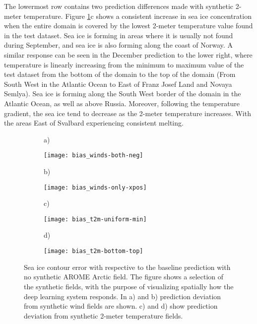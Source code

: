 \documentclass[../main/thesis.tex]{subfiles}
\begin{document}
The lowermost row contains two prediction differences made with synthetic 2-meter temperature. Figure \ref{fig:synthetic_aa_bias}c shows a consistent increase in sea ice concentration when the entire domain is covered by the lowest 2-meter temperature value found in the test dataset. Sea ice is forming in areas where it is usually not found during September, and sea ice is also forming along the coast of Norway. A similar response can be seen in the December prediction to the lower right, where temperature is linearly increasing from the minimum to maximum value of the test dataset from the bottom of the domain to the top of the domain (From South West in the Atlantic Ocean to East of Franz Josef Land and Novaya Semlya). Sea ice is forming along the South West border of the domain in the Atlantic Ocean, as well as above Russia. Moreover, following the temperature gradient, the sea ice tend to decrease as the 2-meter temperature increases. With the areas East of Svalbard experiencing consistent melting.

\begin{figure}
    \centering
    \begin{subfigure}[t]{.03\textwidth}
        a)
    \end{subfigure}
    \begin{subfigure}[t]{.455\textwidth}
        \texttt{[image: bias\_winds-both-neg]}
    \end{subfigure}
    \begin{subfigure}[t]{.03\textwidth}
        b)
    \end{subfigure}
    \begin{subfigure}[t]{.455\textwidth}
        \texttt{[image: bias\_winds-only-xpos]}
    \end{subfigure}
    \begin{subfigure}[t]{.03\textwidth}
        c)
    \end{subfigure}
    \begin{subfigure}[t]{.455\textwidth}
        \texttt{[image: bias\_t2m-uniform-min]}
    \end{subfigure}
    \begin{subfigure}[t]{.03\textwidth}
        d)
    \end{subfigure}
    \begin{subfigure}[t]{.455\textwidth}
        \texttt{[image: bias\_t2m-bottom-top]}
    \end{subfigure}
    \caption{\label{fig:synthetic_aa_bias}Sea ice contour error with respective to the baseline prediction with no synthetic AROME Arctic field. The figure shows a selection of the synthetic fields, with the purpose of visualizing spatially how the deep learning system responds. In a) and b) prediction deviation from synthetic wind fields are shown. c) and d) show prediction deviation from synthetic 2-meter temperature fields.}
\end{figure}
\end{document}
